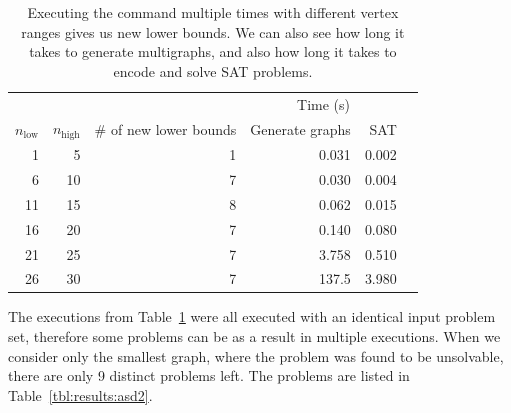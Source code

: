 \begin{table}[H]
    \centering
    \begin{tabular}{rrrrrr}
        \toprule
        &&& \multicolumn{2}{c}{Time (s)} \\
        \cmidrule{4-5}
        $n_\text{low}$ & $n_\text{high}$ & \# of new lower bounds & Generate graphs & SAT\\
        \midrule
        1  & 5  & 1 & 0.031 & 0.002\\
        6  & 10 & 7 & 0.030 & 0.004\\
        11 & 15 & 8 & 0.062 & 0.015\\
        16 & 20 & 7 & 0.140 & 0.080\\
        21 & 25 & 7 & 3.758 & 0.510\\
        26 & 30 & 7 & 137.5 & 3.980\\
        \bottomrule
    \end{tabular}
    \caption{%
    Executing the command multiple times with different vertex ranges gives us new lower bounds.
    We can also see how long it takes to generate multigraphs, and also how long it takes to encode and solve SAT problems.
    }
    \label{tbl:results:asd1}
\end{table}

The executions from Table~\ref{tbl:results:asd1} were all executed with an identical input problem set, therefore some problems can be as a result in multiple executions.
When we consider only the smallest graph, where the problem was found to be unsolvable, there are only 9 distinct problems left.
The problems are listed in Table~\ref{tbl:results:asd2}.

